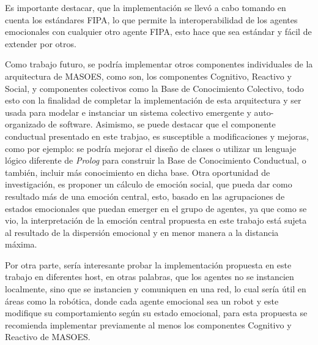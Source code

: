Es importante destacar, que la implementación se llevó a cabo tomando en cuenta los estándares FIPA,
lo que permite la interoperabilidad de los agentes emocionales con cualquier otro agente FIPA,
esto hace que sea estándar y fácil de extender por otros.

Como trabajo futuro, se podría implementar otros componentes individuales de la arquitectura de MASOES,
como son, los componentes Cognitivo, Reactivo y Social, y componentes colectivos como
la Base de Conocimiento Colectivo, todo esto con la finalidad de completar la implementación
de esta arquitectura y ser usada para modelar e instanciar un sistema colectivo
emergente y auto-organizado de software. Asimismo, se puede destacar que el componente conductual
presentado en este trabjao, es susceptible a modificaciones y mejoras, como por ejemplo:
se podría mejorar el diseño de clases o utilizar un lenguaje lógico diferente de \textit{Prolog}
para construir la Base de Conocimiento Conductual, o también, incluir más conocimiento
en dicha base.
Otra oportunidad de investigación, es proponer un cálculo de emoción social,
que pueda dar como resultado más de una emoción central, esto, basado en las agrupaciones de estados emocionales
que puedan emerger en el grupo de agentes, ya que como se vio, la interpretación de la emoción central propuesta
en este trabajo está sujeta al resultado de la dispersión emocional y en menor manera a la distancia máxima.

Por otra parte, sería interesante probar la implementación propuesta en este trabajo
en diferentes host, en otras palabras, que los agentes no se instancien localmente, sino
que se instancien y comuniquen en una red, lo cual sería útil en áreas como la robótica,
donde cada agente emocional sea un robot y este modifique su comportamiento
según su estado emocional, para esta propuesta se recomienda implementar previamente
al menos los componentes Cognitivo y Reactivo de MASOES.
